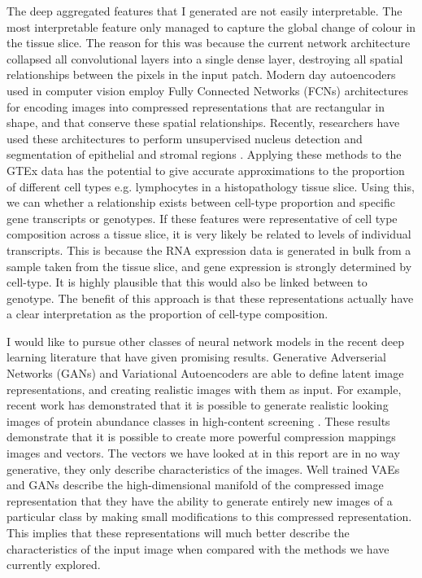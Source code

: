 \documentclass[graybox]{svmult}
\begin{document}
The deep aggregated features that I generated are not easily interpretable. The most interpretable feature only managed to capture the global change of colour in the tissue slice. The reason for this was because the current network architecture collapsed all convolutional layers into a single dense layer, destroying all spatial relationships between the pixels in the input patch. Modern day autoencoders used in computer vision employ Fully Connected Networks (FCNs) \cite{fully-convolutional-networks} architectures for encoding images into compressed representations that are rectangular in shape, and that conserve these spatial relationships. Recently, researchers have used these architectures to perform unsupervised nucleus detection \cite{sparse-autoencoders}  and segmentation of epithelial and stromal regions \cite{segmenting-classifying-epithelial}. Applying these methods to the GTEx data has the potential to give accurate approximations to the proportion of different cell types e.g. lymphocytes in a histopathology tissue slice. Using this, we can whether a relationship exists between cell-type proportion and specific gene transcripts or genotypes. If these features were representative of cell type composition across a tissue slice, it is very likely be related to levels of individual transcripts. This is because the RNA expression data is generated in bulk from a sample taken from the tissue slice, and gene expression is strongly determined by cell-type. It is highly plausible that this would also be linked between to genotype. The benefit of this approach is that these representations actually have a clear interpretation as the proportion of cell-type composition.

I would like to pursue other classes of neural network models in the recent deep learning literature that have given promising results. Generative Adverserial Networks (GANs) \cite{generative-adverserial-networks} and Variational Autoencoders \cite{variational-autoencoders} are able to define latent image representations, and creating realistic images with them as input. For example, recent work has demonstrated that it is possible to generate realistic looking images of protein abundance classes in high-content screening \cite{gans-biological-image-synthesis}. These results demonstrate that it is possible to create more powerful compression mappings  images and vectors. The vectors we have looked at in this report are in no way generative, they only describe characteristics of the images. Well trained VAEs and GANs describe the high-dimensional manifold of the compressed image representation that they have the ability to generate entirely new images of a particular class by making small modifications to this compressed representation. This implies that these representations will much better describe the characteristics of the input image when compared with the methods we have currently explored.
\end{document}
